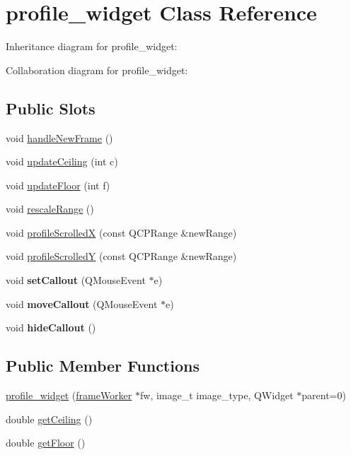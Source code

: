 \hypertarget{classprofile__widget}{\section{profile\+\_\+widget Class Reference}
\label{classprofile__widget}
}


Inheritance diagram for profile\+\_\+widget\+:


Collaboration diagram for profile\+\_\+widget\+:
\subsection*{Public Slots}
\begin{DoxyCompactItemize}
\item 
void \hyperlink{group__renderfunc_ga44be841e46ac7a6f425ed5ae3eeb59b1}{handle\+New\+Frame} ()
\item 
void \hyperlink{group__plotfunc_ga6a4cd513b932ef5d1c6e8e2ddb0dd2c8}{update\+Ceiling} (int c)
\item 
void \hyperlink{group__plotfunc_ga59aa2ce4533f4134b5e63d30d7d246a5}{update\+Floor} (int f)
\item 
void \hyperlink{group__plotfunc_ga13e4eef45eecd7d2d5fc04da4e70ab73}{rescale\+Range} ()
\item 
void \hyperlink{group__plotfunc_gaae1d5bdfda189bdb6b6063f0ea68848c}{profile\+Scrolled\+X} (const Q\+C\+P\+Range \&new\+Range)
\item 
void \hyperlink{group__plotfunc_gab6fe48d4a076233b021907d07d637bae}{profile\+Scrolled\+Y} (const Q\+C\+P\+Range \&new\+Range)
\item 
\hypertarget{classprofile__widget_abd3bd288f2ae47ab20bf5a5c198fba57}{void {\bfseries set\+Callout} (Q\+Mouse\+Event $\ast$e)}\label{classprofile__widget_abd3bd288f2ae47ab20bf5a5c198fba57}

\item 
\hypertarget{classprofile__widget_a4a5618f03ff0c00a9c094d54fc11571d}{void {\bfseries move\+Callout} (Q\+Mouse\+Event $\ast$e)}\label{classprofile__widget_a4a5618f03ff0c00a9c094d54fc11571d}

\item 
\hypertarget{classprofile__widget_a995f424fc31d6f2d48db183cdde19e4a}{void {\bfseries hide\+Callout} ()}\label{classprofile__widget_a995f424fc31d6f2d48db183cdde19e4a}

\end{DoxyCompactItemize}
\subsection*{Public Member Functions}
\begin{DoxyCompactItemize}
\item 
\hyperlink{classprofile__widget_a99bf33e37c1a1a83d000160f325b6295}{profile\+\_\+widget} (\hyperlink{classframeWorker}{frame\+Worker} $\ast$fw, image\+\_\+t image\+\_\+type, Q\+Widget $\ast$parent=0)
\item 
double \hyperlink{group__getters_gaddbd0d14d726d6c732552a570d3423cc}{get\+Ceiling} ()
\item 
double \hyperlink{group__getters_ga778c07bb85d7cc0bb69c869354a8f3e3}{get\+Floor} ()
\end{DoxyCompactItemize}
